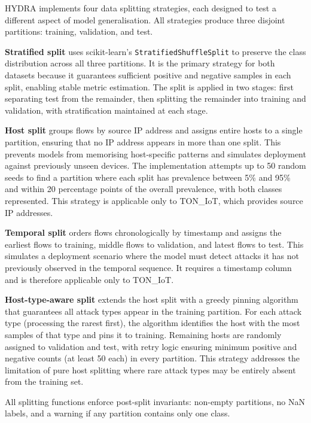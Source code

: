 \documentclass[12pt,a4paper]{report}
\begin{document}
HYDRA implements four data splitting strategies, each designed to test a different aspect of model generalisation. All strategies produce three disjoint partitions: training, validation, and test.

\textbf{Stratified split} uses scikit-learn's \texttt{StratifiedShuffleSplit} to preserve the class distribution across all three partitions. It is the primary strategy for both datasets because it guarantees sufficient positive and negative samples in each split, enabling stable metric estimation. The split is applied in two stages: first separating test from the remainder, then splitting the remainder into training and validation, with stratification maintained at each stage.

\textbf{Host split} groups flows by source IP address and assigns entire hosts to a single partition, ensuring that no IP address appears in more than one split. This prevents models from memorising host-specific patterns and simulates deployment against previously unseen devices. The implementation attempts up to 50 random seeds to find a partition where each split has prevalence between 5\% and 95\% and within 20 percentage points of the overall prevalence, with both classes represented. This strategy is applicable only to TON\_IoT, which provides source IP addresses.

\textbf{Temporal split} orders flows chronologically by timestamp and assigns the earliest flows to training, middle flows to validation, and latest flows to test. This simulates a deployment scenario where the model must detect attacks it has not previously observed in the temporal sequence. It requires a timestamp column and is therefore applicable only to TON\_IoT.

\textbf{Host-type-aware split} extends the host split with a greedy pinning algorithm that guarantees all attack types appear in the training partition. For each attack type (processing the rarest first), the algorithm identifies the host with the most samples of that type and pins it to training. Remaining hosts are randomly assigned to validation and test, with retry logic ensuring minimum positive and negative counts (at least 50 each) in every partition. This strategy addresses the limitation of pure host splitting where rare attack types may be entirely absent from the training set.

All splitting functions enforce post-split invariants: non-empty partitions, no NaN labels, and a warning if any partition contains only one class.
\end{document}
